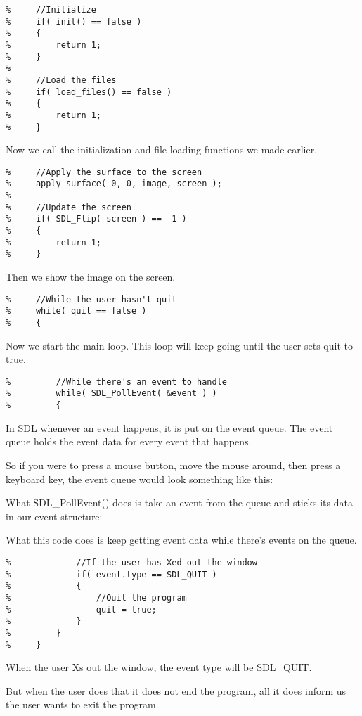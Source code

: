 \begin{verbatim}
%     //Initialize
%     if( init() == false )
%     {
%         return 1;    
%     }
%     
%     //Load the files
%     if( load_files() == false )
%     {
%         return 1;    
%     }
\end{verbatim}

Now we call the initialization and file loading functions we made earlier.

\begin{verbatim}
%     //Apply the surface to the screen
%     apply_surface( 0, 0, image, screen );
%     
%     //Update the screen
%     if( SDL_Flip( screen ) == -1 )
%     {
%         return 1;    
%     }
\end{verbatim}

Then we show the image on the screen.

\begin{verbatim}
%     //While the user hasn't quit
%     while( quit == false )
%     {
\end{verbatim}

Now we start the main loop. This loop will keep going until the user sets quit
to true.

\begin{verbatim}
%         //While there's an event to handle
%         while( SDL_PollEvent( &event ) )
%         {
\end{verbatim}

In SDL whenever an event happens, it is put on the event queue. The event queue
holds the event data for every event that happens.

So if you were to press a mouse button, move the mouse around, then press a
keyboard key, the event queue would look something like this:

What SDL\_PollEvent() does is take an event from the queue and sticks its data
in our event structure:

What this code does is keep getting event data while there's events on the
queue.

\begin{verbatim}
%             //If the user has Xed out the window
%             if( event.type == SDL_QUIT )
%             {
%                 //Quit the program
%                 quit = true;
%             }    
%         }
%     }
\end{verbatim}

When the user Xs out the window, the event type will be SDL\_QUIT.

But when the user does that it does not end the program, all it does inform us
the user wants to exit the program.

